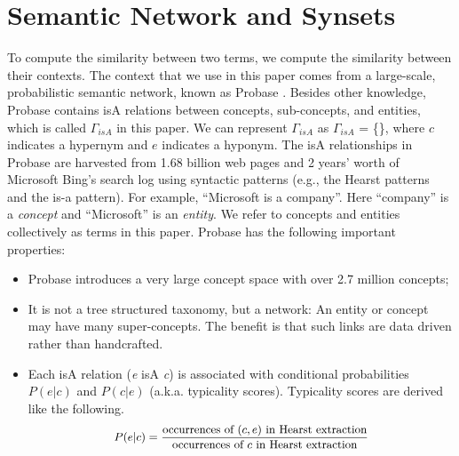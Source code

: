 \section{Semantic Network and Synsets}
\label{sec:knowledge}

To compute the similarity between two terms, we compute the similarity
between their contexts. The context that we use in this paper comes from a
large-scale, probabilistic semantic network, known as Probase
\cite{12MSRA:Probase}. Besides other knowledge, Probase contains isA
relations between concepts, sub-concepts, and entities, which is called
$\Gamma_{isA}$ in this paper.
We can represent $\Gamma_{isA}$ as $\Gamma_{isA}$ = \{\},
where $c$ indicates a hypernym and $e$ indicates a hyponym.
The isA relationships in Probase are harvested from 1.68 billion web
 pages and 2 years' worth of Microsoft Bing's search log using syntactic patterns
(e.g., the Hearst patterns~\cite{Hearst:Automatic} and the is-a pattern).
For example,
``Microsoft is a company''. Here ``company'' is a {\em concept} and
``Microsoft'' is an {\em
  entity}. %
We refer to concepts and entities collectively as terms in this
paper. %
  Probase has the following important properties:
\begin{itemize}
\item Probase introduces a very large concept space with over 2.7
  million concepts;
\item It is not a tree structured taxonomy, but a network: An entity
  or concept may have many super-concepts.
  The benefit is that such links are data driven rather than
  handcrafted.
\item Each isA relation (\emph{e} isA \emph{c}) is associated with conditional
  probabilities $P(e|c)$ and $P(c|e)$ (a.k.a.  typicality scores).
 Typicality scores are derived like the following.
\begin{displaymath}
\small{
\begin{aligned}
P(e|c) = \frac{\mbox{occurrences of }(c,e)\mbox{ in Hearst extraction}}{\mbox{occurrences of }c\mbox{ in Hearst extraction}}
\end{aligned}
}
\end{displaymath}
\end{itemize}

